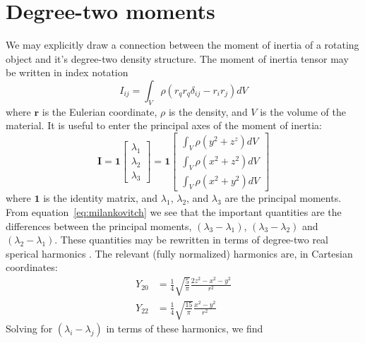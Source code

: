 \documentclass[extra,mreferee]{gji}
\newif\ifdetail
\begin{document}
\appendix

\section{Degree-two moments}
\label{appendix:moments}

We may explicitly draw a connection between the moment of inertia of a rotating object and it's degree-two density structure.  The moment of inertia tensor may be written in index notation
\begin{equation}
I_{ij} = \int_V \rho \left( r_q r_q \delta_{ij} - r_i r_j \right) dV
\label{eq:inertia}
\end{equation}
where $\mathbf{r}$ is the Eulerian coordinate, $\rho$ is the density, and $V$ is the volume of the material.  
It is useful to enter the principal axes of the moment of inertia:
\begin{equation}
\mathbf{I} = \mathbf{1} \begin{bmatrix}
\lambda_1 \\ \lambda_2 \\ \lambda_3
\end{bmatrix} = 
\mathbf{1} \begin{bmatrix}
\int_V \rho (y^2+z^z) dV\\
\int_V \rho (x^2+z^2) dV\\
\int_V \rho (x^2+y^2) dV
\end{bmatrix}
\end{equation}
where $\mathbf{1}$ is the identity matrix, and $\lambda_1$, $\lambda_2$, and $\lambda_3$ are the principal moments.
From equation~\eqref{eq:milankovitch} we see that the important quantities are the differences between the 
principal moments, $(\lambda_3-\lambda_1)$, $(\lambda_3-\lambda_2)$ and $(\lambda_2-\lambda_1)$.
These quantities may be rewritten in terms of degree-two real sperical harmonics \citep[e.g.][]{dahlen1999theoretical}.
The relevant (fully normalized) harmonics are, in Cartesian coordinates:
\begin{equation}
\begin{aligned}
Y_{20} &= \frac{1}{4} \sqrt{\frac{ 5}{\pi}} \frac{ 2 z^2 - x^2 - y^2}{r^2} \\ 
Y_{22} &= \frac{1}{4} \sqrt{\frac{15}{\pi}} \frac{ x^2 - y^2}{r^2}
\end{aligned}
\end{equation}
Solving for $( \lambda_i - \lambda_j )$ in terms of these harmonics, we find
\ifdetail
\end{document}
